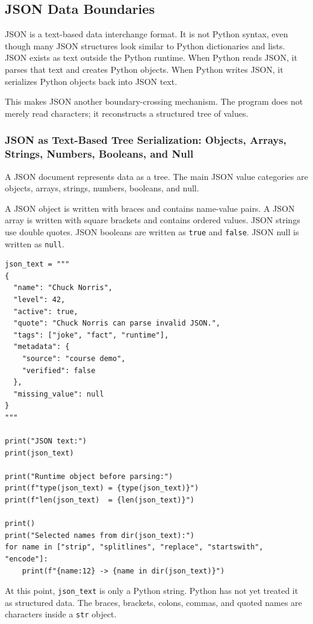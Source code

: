 \subsection{JSON Data Boundaries}

JSON is a text-based data interchange format. It is not Python syntax, even though many JSON structures look similar to Python dictionaries and lists. JSON exists as text outside the Python runtime. When Python reads JSON, it parses that text and creates Python objects. When Python writes JSON, it serializes Python objects back into JSON text.

This makes JSON another boundary-crossing mechanism. The program does not merely read characters; it reconstructs a structured tree of values.

\subsubsection{JSON as Text-Based Tree Serialization: Objects, Arrays, Strings, Numbers, Booleans, and Null}

A JSON document represents data as a tree. The main JSON value categories are objects, arrays, strings, numbers, booleans, and null.

A JSON object is written with braces and contains name-value pairs. A JSON array is written with square brackets and contains ordered values. JSON strings use double quotes. JSON booleans are written as \texttt{true} and \texttt{false}. JSON null is written as \texttt{null}.

\begin{verbatim}
json_text = """
{
  "name": "Chuck Norris",
  "level": 42,
  "active": true,
  "quote": "Chuck Norris can parse invalid JSON.",
  "tags": ["joke", "fact", "runtime"],
  "metadata": {
    "source": "course demo",
    "verified": false
  },
  "missing_value": null
}
"""

print("JSON text:")
print(json_text)

print("Runtime object before parsing:")
print(f"type(json_text) = {type(json_text)}")
print(f"len(json_text)  = {len(json_text)}")

print()
print("Selected names from dir(json_text):")
for name in ["strip", "splitlines", "replace", "startswith", "encode"]:
    print(f"{name:12} -> {name in dir(json_text)}")
\end{verbatim}

At this point, \texttt{json\_text} is only a Python string. Python has not yet treated it as structured data. The braces, brackets, colons, commas, and quoted names are characters inside a \texttt{str} object.

